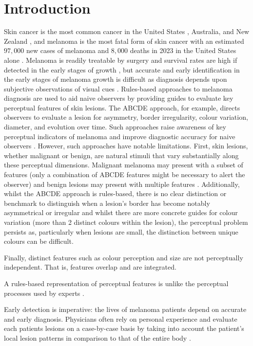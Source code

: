 \documentclass[a4paper, natbib, doc, 12pt]{apa7}
\begin{document}
\section{Introduction}
Skin cancer is the most common cancer in the United States \citep{guy2015vital}, Australia, and New Zealand \citep{perera2015incidence}, and melanoma is the most fatal form of skin cancer with an estimated $97, 000$ new cases of melanoma and $8, 000$ deaths in 2023 in the United States alone \citep{siegel2023cancer}. Melanoma is readily treatable by surgery and survival rates are high if detected in the early stages of growth \citep{davis2019current, rigel2010evolution}, but accurate and early identification in the early stages of melanoma growth is difficult as diagnosis depends upon subjective observations of visual cues \citep{dreiseitl2012differences}. Rules-based approaches to melanoma diagnosis are used to aid naive observers by providing guides to evaluate key perceptual features of skin lesions. The ABCDE approach, for example, directs observers to evaluate a lesion for  asymmetry, border irregularity, colour variation, diameter, and evolution over time. Such approaches raise awareness of key perceptual indicators of melanoma and improve diagnostic accuracy for naive observers \citep{rourke2015learning,tsao2015early}. However, such approaches have notable limitations. First, skin lesions, whether malignant or benign, are natural stimuli that vary substantially along these perceptual dimensions. Malignant melanoma may present with a subset of features (only a combination of ABCDE features might be necessary to alert the observer) and benign lesions may present with multiple features \citep{rigel2010evolution}. Additionally, whilst the ABCDE approach is rules-based, there is no clear distinction or benchmark to distinguish when a lesion's border has become notably asymmetrical or irregular and whilst there are more concrete guides for colour variation (more than 2 distinct colours within the lesion), the perceptual problem persists as, particularly when lesions are small, the distinction between unique colours can be difficult.

Finally, distinct features such as colour perception and size are not perceptually independent. That is, features overlap and are integrated.

A rules-based representation of perceptual features is unlike the perceptual processes used by experts \citep{norman1989development, gachon2005first}.


Early detection is imperative: the lives of melanoma patients depend on accurate and early diagnosis. Physicians often rely on personal experience and evaluate each patients lesions on a case-by-case basis by taking into account the patient's local lesion patterns in comparison to that of the entire body \citep{gachon2005first}. 
\end{document}
